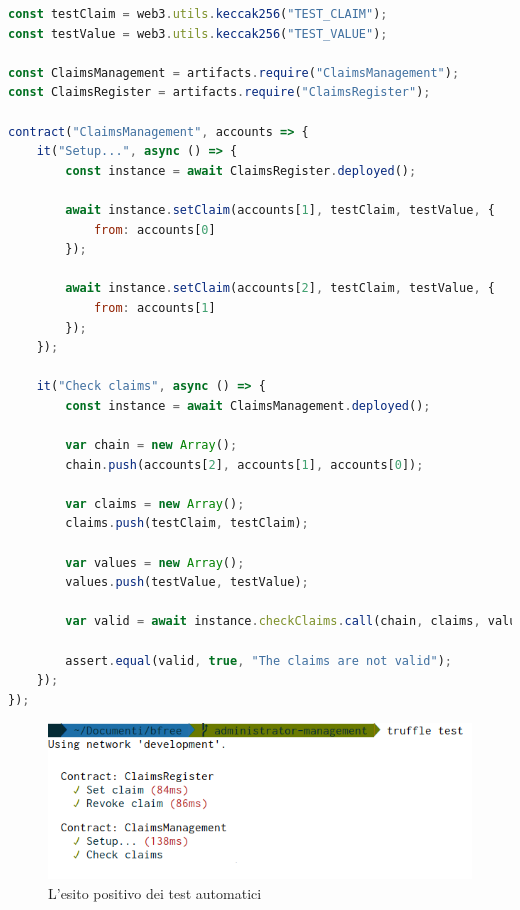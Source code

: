 \noindent
\begin{minipage}{\linewidth}
\begin{lstlisting}[language=JavaScript]
const testClaim = web3.utils.keccak256("TEST_CLAIM");
const testValue = web3.utils.keccak256("TEST_VALUE");

const ClaimsManagement = artifacts.require("ClaimsManagement");
const ClaimsRegister = artifacts.require("ClaimsRegister");

contract("ClaimsManagement", accounts => {
    it("Setup...", async () => {
        const instance = await ClaimsRegister.deployed();

        await instance.setClaim(accounts[1], testClaim, testValue, {
            from: accounts[0]
        });

        await instance.setClaim(accounts[2], testClaim, testValue, {
            from: accounts[1]
        });
    });

    it("Check claims", async () => {
        const instance = await ClaimsManagement.deployed();

        var chain = new Array();
        chain.push(accounts[2], accounts[1], accounts[0]);

        var claims = new Array();
        claims.push(testClaim, testClaim);

        var values = new Array();
        values.push(testValue, testValue);

        var valid = await instance.checkClaims.call(chain, claims, values);

        assert.equal(valid, true, "The claims are not valid");
    }); 
});
\end{lstlisting}
\end{minipage}

\begin{figure}[ht!]
    \centering
    \includegraphics[scale=0.5]{img/test.png}
    \caption{L'esito positivo dei test automatici}
    \label{fig:test}
\end{figure}

\newpage